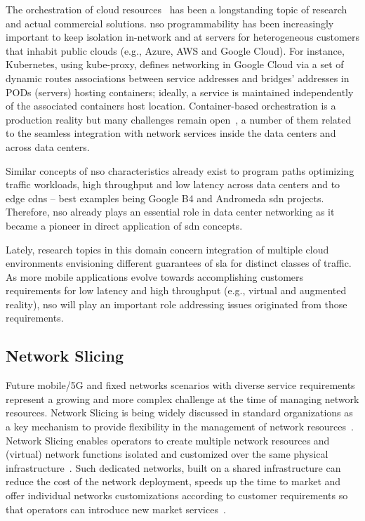 The orchestration of cloud resources~\cite{liu2011cloud} has been a longstanding topic of research and actual commercial solutions.  \gls{nso} programmability has been increasingly important to keep isolation in-network and at servers for heterogeneous customers that inhabit public clouds (e.g., Azure, AWS and Google Cloud). For instance, Kubernetes, using kube-proxy, defines networking in Google Cloud via a set of dynamic routes associations between service addresses and bridges' addresses in PODs (servers) hosting containers; ideally, a service is maintained independently of the associated containers host location. Container-based orchestration is a production reality but many challenges remain open~\cite{7185168}, a number of them related to the seamless integration with network services inside the data centers and across data centers.

Similar concepts of \gls{nso} characteristics already exist to program paths optimizing traffic workloads, high throughput and low latency across data centers and to edge \glspl{cdn} -- best examples being Google B4 and Andromeda \gls{sdn} projects. Therefore, \gls{nso} already plays an essential role in data center networking as it became a pioneer in direct application of \gls{sdn} concepts. 

Lately, research topics in this domain concern integration of multiple cloud environments envisioning different guarantees of \gls{sla} for distinct classes of traffic. As more mobile applications evolve towards accomplishing customers requirements for low latency and high throughput (e.g., virtual and augmented reality), \gls{nso} will play an important role addressing issues originated from those requirements.  

\subsection{Network Slicing}

Future mobile/5G and fixed networks scenarios with diverse service requirements represent a growing and more complex challenge at the time of managing network resources. Network Slicing is being widely discussed in standard organizations as a key mechanism to provide flexibility in the management of network resources~\cite{NGMN:5G:2017}. Network Slicing enables operators to create multiple network resources and (virtual) network functions isolated and customized over the same physical infrastructure~\cite{Galis:2018}. Such dedicated networks, built on a shared infrastructure can reduce the cost of the network deployment, speeds up the time to market and offer individual networks customizations according to customer requirements so that operators can introduce new market services~\cite{Devlic2017NESMO:Framework}. 

